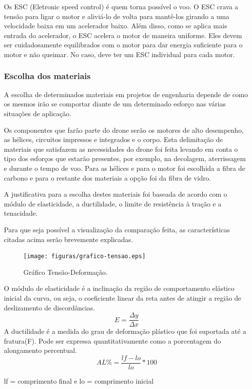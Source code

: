 Os ESC (Eletronic speed control) é quem torna possível o voo. O ESC crava a tensão para ligar o motor e aliviá-lo de volta para mantê-los girando a uma velocidade baixa em um acelerador baixo. Além disso, como se aplica mais entrada do acelerador, o ESC acelera o motor de maneira uniforme.  Eles devem ser cuidadosamente equilibrados com o motor para dar energia suficiente para o motor e não queimar. No caso, deve ter um ESC individual para cada motor. 

\subsubsection{Escolha dos materiais}

A escolha de determinados materiais em projetos de engenharia depende de como os mesmos irão se comportar diante de um determinado esforço nas várias situações de aplicação.

Os componentes que farão parte do drone serão os motores de alto desempenho, as hélices, circuitos impressos e integrados e o corpo.
Esta delimitação de materiais que satisfazem as necessidades do drone foi feita levando em conta o tipo dos esforços que estarão presentes, por exemplo, na decolagem, aterrissagem e durante o tempo de voo. Para as hélices e para o motor foi escolhida a fibra de carbono e para o restante dos materiais a opção foi da fibra de vidro.

A justificativa para a escolha destes materiais foi baseada de acordo com o módulo de elasticidade, a ductilidade, o limite de resistência à tração e a tenacidade. 

Para que seja possível a visualização da comparação feita, as características citadas acima serão brevemente explicadas.


\begin{figure}[H]
    \centering
      \texttt{[image: figuras/grafico-tensao.eps]}
    \caption{Gráfico Tensão-Deformação.}
    \label{fig:grafico-tensao}
\end{figure}

O módulo de elasticidade é a inclinação da região de comportamento elástico inicial da curva, ou seja, o coeficiente linear da reta antes de atingir a região de deslizamento de discordâncias.
\begin{equation}
E =\frac{\Delta y}{\Delta x}
\end{equation}
A ductilidade é a medida do grau de deformação plástico que foi suportada até a fratura(F). Pode ser expressa quantitativamente como a porcentagem do alongamento percentual.
\begin{equation}
AL\% =\frac{lf - lo}{lo} * 100
\end{equation}
\begin{center}
lf = comprimento final e lo = comprimento inicial
\end{center}

